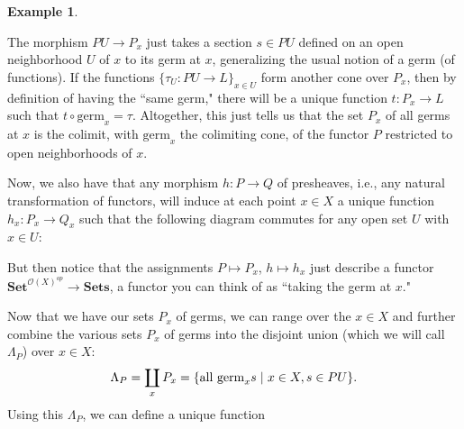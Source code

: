 \documentclass[11pt]{book}
\theoremstyle{definition}
\newtheorem{example}{Example}[section]
\theoremstyle{definition}
\theoremstyle{definition}
\theoremstyle{theorem}
\theoremstyle{definition}
\begin{document}
\begin{example}
	\begin{center} 
	\end{center} 
	The morphism $PU \rightarrow P_x$ just takes a section $s \in PU$ defined on an open neighborhood $U$ of $x$ to its germ at $x$, generalizing the usual notion of a germ (of functions). If the functions $\{\tau_U: PU \rightarrow L\}_{x \in U}$ form another cone over $P_x$, then by definition of having the ``same germ," there will be a unique function $t: P_x \rightarrow L$ such that $t \circ \text{germ}_x = \tau$. Altogether, this just tells us that the set $P_x$ of all germs at $x$ is the colimit, with $\text{germ}_x$ the colimiting cone, of the functor $P$ restricted to open neighborhoods of $x$. \par 
	Now, we also have that any morphism $h: P \rightarrow Q$ of presheaves, i.e., any natural transformation of functors, will induce at each point $x \in X$ a unique function $h_x: P_x \rightarrow Q_x$ such that the following diagram commutes for any open set $U$ with $x \in U$: 
	\begin{center} 
	\end{center}  
	But then notice that the assignments $P \mapsto P_x$, $h \mapsto h_x$ just describe a functor $\textbf{Set}^{\mathscr{O}(X)^{op}} \rightarrow \textbf{Sets}$, a functor you can think of as ``taking the germ at $x$." \par
	Now that we have our sets $P_x$ of germs, we can range over the $x \in X$ and further combine the various sets $P_x$ of germs into the disjoint union (which we will call $\Lambda_P$) over $x \in X$: 
	\begin{equation}
	\Lambda_P = \coprod_x P_x = \{\text{all } \text{germ}_x s \hspace*{0.3em}| \hspace*{0.3em} x \in X, s \in PU\}.
	\end{equation}
	Using this $\Lambda_P$, we can define a unique function 

\end{example}
\end{document}
